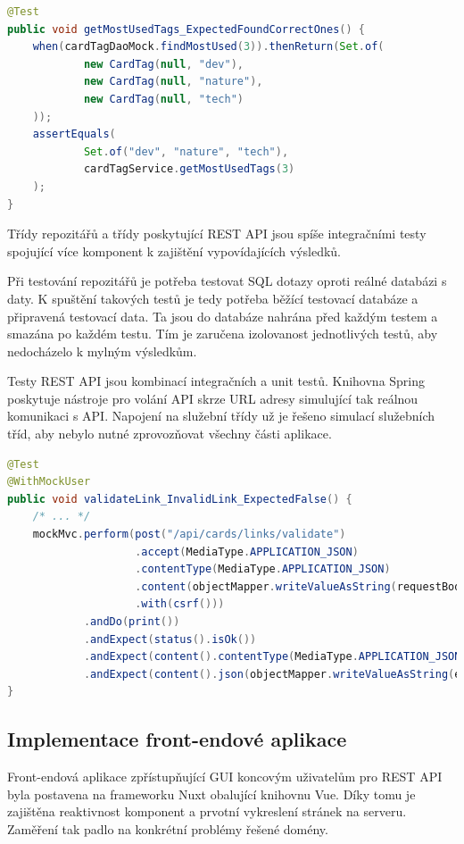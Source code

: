 		\begin{lstlisting}[language=Java, caption={Testu ověřující, že služba štítků vrací správné nejvyužívanější štítky z nasimulovaného repozitáře. Zdroj: [autor]}]
@Test
public void getMostUsedTags_ExpectedFoundCorrectOnes() {
	when(cardTagDaoMock.findMostUsed(3)).thenReturn(Set.of(
			new CardTag(null, "dev"),
			new CardTag(null, "nature"),
			new CardTag(null, "tech")
	));
	assertEquals(
			Set.of("dev", "nature", "tech"),
			cardTagService.getMostUsedTags(3)
	);
}
		\end{lstlisting}

		Třídy repozitářů a třídy poskytující \ac{REST} \ac{API} jsou spíše integračními testy spojující více
		komponent k zajištění vypovídajících výsledků.

		Při testování repozitářů je potřeba testovat \ac{SQL} dotazy oproti reálné databázi s daty.
		K spuštění takových testů je tedy potřeba běžící testovací databáze a připravená testovací data.
		Ta jsou do databáze nahrána před každým testem a smazána po každém testu.
		Tím je zaručena izolovanost jednotlivých testů, aby nedocházelo k mylným výsledkům.

		Testy \ac{REST} \ac{API} jsou kombinací integračních a unit testů.
		Knihovna Spring poskytuje nástroje pro volání \ac{API} skrze \ac{URL} adresy simulující tak reálnou komunikaci
		s \ac{API}.
		Napojení na služební třídy už je řešeno simulací služebních tříd, aby nebylo nutné zprovozňovat všechny části
		aplikace.

		\begin{lstlisting}[language=Java, caption={Ukázka testu volání API validující odkaz. Zdroj: [autor]}]
@Test
@WithMockUser
public void validateLink_InvalidLink_ExpectedFalse() {
	/* ... */
	mockMvc.perform(post("/api/cards/links/validate")
					.accept(MediaType.APPLICATION_JSON)
					.contentType(MediaType.APPLICATION_JSON)
					.content(objectMapper.writeValueAsString(requestBody))
					.with(csrf()))
			.andDo(print())
			.andExpect(status().isOk())
			.andExpect(content().contentType(MediaType.APPLICATION_JSON))
			.andExpect(content().json(objectMapper.writeValueAsString(expectedResponseBody)));
}
		\end{lstlisting}

	\subsection{Implementace front-endové aplikace}

	Front-endová aplikace zpřístupňující \ac{GUI} koncovým uživatelům pro \ac{REST} \ac{API} byla postavena na frameworku
	Nuxt obalující knihovnu Vue.
	Díky tomu je zajištěna reaktivnost komponent a prvotní vykreslení stránek na serveru.
	Zaměření tak padlo na konkrétní problémy řešené domény.

